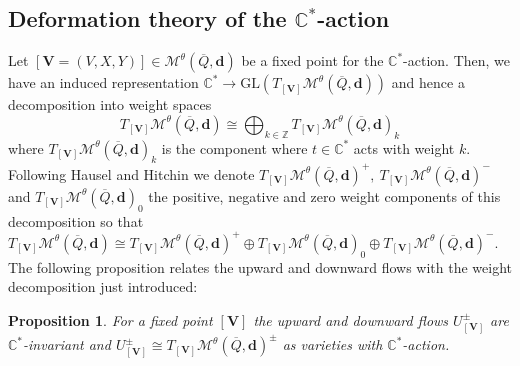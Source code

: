 \documentclass{amsart}
\theoremstyle{plain}
\newtheorem{proposition}[theorem]{Proposition}
\numberwithin{equation}{section}
\theoremstyle{definition}
\theoremstyle{remark}
\begin{document}
	\subsection{Deformation theory of the $\mathbb{C}^*$-action}
	Let $[\mathbf{V}=(V,X,Y)]\in \mathcal{M}^{\theta}(\overline{Q},\mathbf{d})$  be a fixed point for the $\mathbb{C}^*$-action. Then, we have an induced representation $\mathbb{C}^*\to \text{GL}(T_{[\mathbf{V}]}\mathcal{M}^{\theta}(\overline{Q},\mathbf{d}))$ and hence a decomposition into weight spaces
	$$
	T_{[\mathbf{V}]}\mathcal{M}^\theta(\overline{Q},\mathbf{d})\cong \bigoplus_{k\in \mathbb{Z}} T_{[\mathbf{V}]}\mathcal{M}^\theta(\overline{Q},\mathbf{d})_k
	$$
	where $T_{[\mathbf{V}]}\mathcal{M}^\theta(\overline{Q},\mathbf{d})_k$ is the component where $t\in \mathbb{C}^*$ acts with weight $k$. Following Hausel and Hitchin \cite[Section 2.1]{HauselHitchin} we denote $T_{[\mathbf{V}]}\mathcal{M}^\theta(\overline{Q},\mathbf{d})^+,\ T_{[\mathbf{V}]}\mathcal{M}^\theta(\overline{Q},\mathbf{d})^-$ and $T_{[\mathbf{V}]}\mathcal{M}^\theta(\overline{Q},\mathbf{d})_0$ the positive, negative and zero weight components of this decomposition so that $T_{[\mathbf{V}]}\mathcal{M}^\theta(\overline{Q},\mathbf{d})\cong T_{[\mathbf{V}]}\mathcal{M}^\theta(\overline{Q},\mathbf{d})^+\oplus T_{[\mathbf{V}]}\mathcal{M}^\theta(\overline{Q},\mathbf{d})_0\oplus T_{[\mathbf{V}]}\mathcal{M}^\theta(\overline{Q},\mathbf{d})^-$. The following proposition relates the upward and downward flows with the weight decomposition just introduced:
	\begin{proposition}\label{upAndDownFlowsIsoWithWeightedTangentSpaces}
		\cite[Proposition 2.1]{HauselHitchin}  For a fixed point $[\mathbf{V}]$ the upward and downward flows $U_{[\mathbf{V}]}^\pm$ are $\mathbb{C}^*$-invariant and $U_{[\mathbf{V}]}^\pm\cong T_{[\mathbf{V}]}\mathcal{M}^\theta(\overline{Q},\mathbf{d})^\pm$ as varieties with $\mathbb{C}^*$-action.
	\end{proposition}
	
\end{document}
